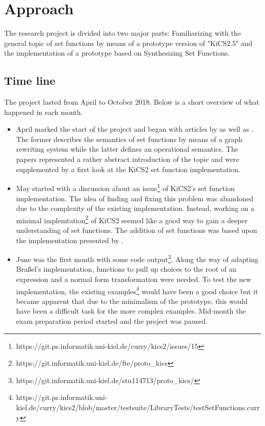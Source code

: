 \documentclass[a4paper, 11pt, fleqn]{scrreprt}
\begin{document}
\chapter{Approach}
The research project is divided into two major parts: Familiarizing with the general topic of set functions by means of a prototype version of "KiCS2.5" and the implementation of a prototype based on Synthesizing Set Functions.
\section{Time line}
The project lasted from April to October 2018. Below is a short overview of what happened in each month.

\begin{itemize}
	\item April marked the start of the project and began with articles by \citet{Antoy:2009:SFF:1599410.1599420} as well as \citet{Christiansen2013ASF}. The former describes the semantics of set functions by means of a graph rewriting system while the latter defines an operational semantics. The papers represented a rather abstract introduction of the topic and were supplemented by a first look at the KiCS2 set function implementation.
	\item May started with a discussion about an issue\footnote{https://git.ps.informatik.uni-kiel.de/curry/kics2/issues/15} of KiCS2's set function implementation. The idea of finding and fixing this problem was abandoned due to the complexity of the existing implementation. Instead, working on a minimal implemtation\footnote{https://git.informatik.uni-kiel.de/fte/proto\_kics} of KiCS2 seemed like a good way to gain a deeper understanding of set functions. The addition of set functions was based upon the implementation presented by \citet{Brassel2010ImplementingFL}.
	\item June was the first month with some code output\footnote{https://git.informatik.uni-kiel.de/stu114713/proto\_kics/}. Along the way of adapting Braßel's implementation, functions to pull up choices to the root of an expression and a normal form transformation were needed. To test the new implementation, the existing examples\footnote{https://git.ps.informatik.uni-kiel.de/curry/kics2/blob/master/testsuite/LibraryTests/testSetFunctions.curry} would have been a good choice but it became apparent that due to the minimalism of the prototype, this would have been a difficult task for the more complex examples. Mid-month the exam preparation period started and the project was paused.

\end{itemize}
\end{document}
